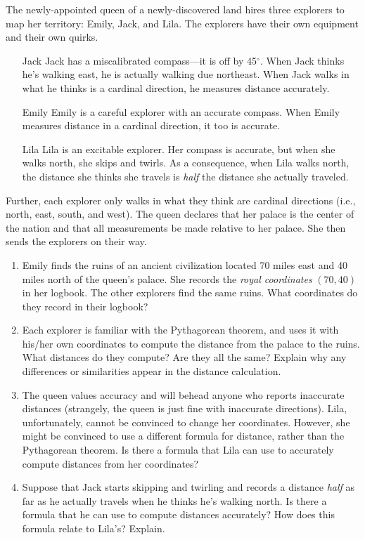 \documentclass[11pt]{report}
\begin{document}
	The newly-appointed queen of a newly-discovered land hires three
	explorers to map her territory: Emily, Jack, and Lila.  The explorers
	have their own equipment and their own quirks.
	\begin{enumerate}
		\item[Jack] Jack has a miscalibrated compass---it is off by 45$^\circ$.
		When Jack thinks he's walking east, he is actually walking
		due northeast.  When Jack walks in what he thinks is a cardinal
		direction, he measures distance accurately.
		\item[Emily] Emily is a careful explorer with an accurate compass.
		When Emily measures distance in a cardinal direction, it too
		is accurate.
		\item[Lila] Lila is an excitable explorer.  Her compass is accurate, but when 
		she walks north, she skips and twirls.  As a consequence, when Lila
		walks north, the distance she thinks she travels is \emph{half} the distance she actually
		traveled.
	\end{enumerate}
	Further, each explorer only walks in what they think are cardinal directions (i.e., north, east,
	south, and west).  The queen declares that her palace is the center of the nation and that all
	measurements be made relative to her palace.  She then sends the explorers on their way.
	\begin{enumerate}
		\item Emily finds the ruins of an ancient civilization located 70 miles east and
		40 miles north of the queen's palace.  She records the \emph{royal coordinates}
		$(70,40)$ in her logbook.  The other explorers find the same ruins.  What
		coordinates do they record in their logbook?
		\item Each explorer is familiar with the Pythagorean theorem, and uses it with
		his/her own coordinates to compute
		the distance from the palace to the ruins.  What distances do they compute?
		Are they all the same?  Explain why any differences or similarities appear
		in the distance calculation.
		\item The queen values accuracy and will behead anyone who reports inaccurate distances
		(strangely, the queen is just fine with inaccurate directions).
		Lila, unfortunately, cannot be convinced to change her coordinates.  However,
		she might be convinced to use a different formula for distance, rather
		than the Pythagorean theorem.  Is there a formula that Lila can use
		to accurately compute distances from her coordinates?
		\item Suppose that Jack starts skipping and twirling and records a distance
		\emph{half} as far as he actually travels when he thinks he's walking
		north.  Is there a formula that he can use to compute distances accurately?
		How does this formula relate to Lila's?  Explain.
	\end{enumerate}
\end{document}

